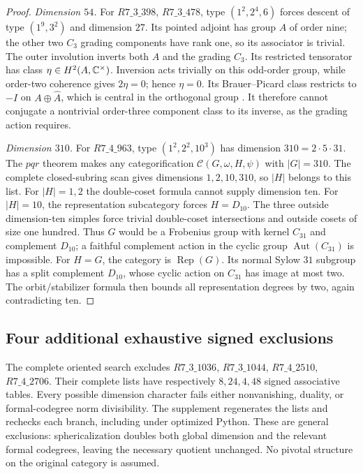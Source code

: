 \begin{proof}
\emph{Dimension $54$.}
For $R7\_3\_398$, $R7\_3\_478$, type $(1^2,2^4,6)$ forces descent
of type $(1^9,3^2)$ and dimension $27$. Its pointed adjoint has group
$A$ of order nine; the other two $C_3$ grading components have rank one,
so its associator is trivial. The outer involution inverts both $A$ and
the grading $C_3$. Its restricted tensorator has class
$\eta\in H^2(A,\mathbb C^\times)$. Inversion acts trivially on this
odd-order group, while order-two coherence gives $2\eta=0$; hence
$\eta=0$. Its Brauer--Picard class restricts to $-I$ on
$A\oplus\widehat A$, which is central in the orthogonal group
\cite[Corollary~1.2]{ENOExt}. It therefore cannot conjugate a nontrivial
order-three component class to its inverse, as the grading action
requires.

\emph{Dimension $310$.}
For $R7\_4\_963$, type $(1^2,2^2,10^3)$ has dimension
$310=2\cdot5\cdot31$. The $pqr$ theorem
\cite[Theorem~9.2]{ENOSolvable} makes any categorification
$\mathcal C(G,\omega,H,\psi)$ with $|G|=310$.
The complete closed-subring scan gives dimensions $1,2,10,310$, so
$|H|$ belongs to this list. For $|H|=1,2$ the double-coset formula
\cite[Theorem~5.1]{GelakiNaidu} cannot supply dimension ten.
For $|H|=10$, the representation subcategory forces $H=D_{10}$.
The three outside dimension-ten simples force trivial double-coset
intersections and outside cosets of size one hundred. Thus $G$ would
be a Frobenius group with kernel $C_{31}$ and complement $D_{10}$;
a faithful complement action in the cyclic group
$\operatorname{Aut}(C_{31})$ is impossible.
For $H=G$, the category is $\operatorname{Rep}(G)$. Its normal Sylow
$31$ subgroup has a split complement $D_{10}$, whose cyclic action on
$C_{31}$ has image at most two. The orbit/stabilizer formula then
bounds all representation degrees by two, again contradicting ten.
\end{proof}

\subsection{Four additional exhaustive signed exclusions}
The complete oriented search excludes
$R7\_3\_1036$, $R7\_3\_1044$, $R7\_4\_2510$, $R7\_4\_2706$.
Their complete lists have respectively $8,24,4,48$ signed associative
tables. Every possible dimension character fails either nonvanishing,
duality, or formal-codegree norm divisibility. The supplement regenerates
the lists and rechecks each branch, including under optimized Python.
These are general exclusions: sphericalization doubles both global
dimension and the relevant formal codegrees, leaving the necessary
quotient unchanged. No pivotal structure on the original category is
assumed.








